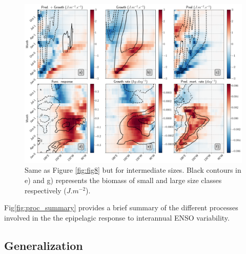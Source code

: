 \begin{figure}[h!tp]
	\centering
	\includegraphics[scale=0.4]{figs/fig9.png}	
	\caption{Same as Figure \ref{fig:fig8} but for intermediate sizes. Black contours in e) and g) represents the biomass of small and large size classes respectively ($J.m^{-2}$).}
	\label{fig:fig9}
\end{figure}

Fig\ref{fig:proc_summary} provides a brief summary of the different processes involved in the the epipelagic response to interannual ENSO variability.




\subsection{Generalization}

